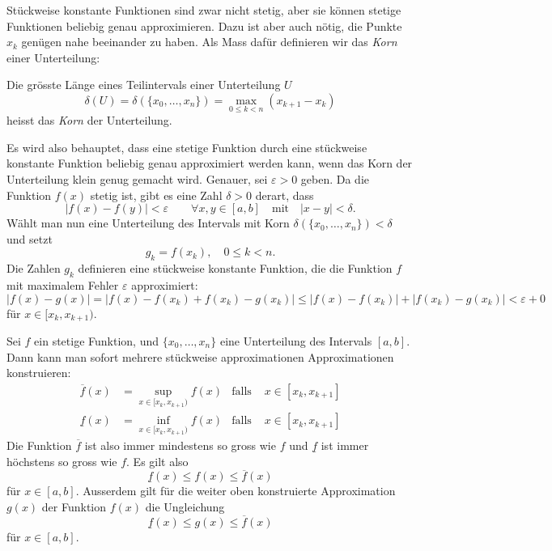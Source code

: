 Stückweise konstante Funktionen sind zwar nicht stetig, aber sie können
stetige Funktionen beliebig genau approximieren.
Dazu ist aber auch nötig, die Punkte $x_k$ genügen nahe beeinander zu
haben.
Als Mass dafür definieren wir das {\em Korn} einer Unterteilung:

\begin{definition}
Die grösste Länge eines Teilintervals einer Unterteilung $U$
\[
\delta(U)
=
\delta(\{x_0,\dots,x_n\})
=
\max_{0\le k < n} (x_{k+1}-x_{k})
\]
heisst das {\em Korn} der Unterteilung.
\end{definition}

Es wird also behauptet, dass eine stetige Funktion durch eine stückweise
konstante Funktion beliebig genau approximiert werden kann, wenn das
Korn der Unterteilung klein genug gemacht wird.
Genauer, sei $\varepsilon>0$ geben.
Da die Funktion $f(x)$ stetig ist, gibt es eine Zahl $\delta>0$ derart,
dass
\[
|f(x) - f(y)| < \varepsilon\qquad\forall x,y\in [a,b]\quad\text{mit}\quad
|x-y|<\delta.
\]
Wählt man nun eine Unterteilung des Intervals mit Korn
$\delta(\{x_0,\dots,x_n\}) < \delta$ und setzt
\[
g_k = f(x_k),\quad 0\le k < n.
\]
Die Zahlen $g_k$ definieren eine stückweise konstante Funktion, die 
die Funktion $f$ mit maximalem Fehler $\varepsilon$ approximiert:
\[
|f(x)-g(x)|
=
|f(x) - f(x_k) + f(x_k) - g(x_k)|
\le
|f(x) - f(x_k)| + |f(x_k) - g(x_k)|
<
\varepsilon + 0
\]
für $x\in [x_k,x_{k+1})$.

Sei $f$ ein stetige Funktion, und $\{x_0,\dots,x_n\}$ eine Unterteilung
des Intervals $[a,b]$.
Dann kann man sofort mehrere stückweise approximationen Approximationen 
konstruieren:
\begin{equation*}
\begin{aligned}
\overline{f}(x)
&= 
\sup_{x\in[x_k,x_{k+1})} f(x)
&\text{falls }&x\in[x_k,x_{k+1}]
\\
\underline{f}(x)
&= 
\inf_{x\in[x_k,x_{k+1})} f(x)
&\text{falls }&x\in[x_k,x_{k+1}]
\end{aligned}
\end{equation*}
Die Funktion $\overline{f}$ ist also immer mindestens so gross wie $f$
und $\underline{f}$ ist immer höchstens so gross wie $f$.
Es gilt also
\[
\underline{f}(x) \le f(x) \le \overline{f}(x)
\]
für $x\in[a,b]$.
Ausserdem gilt für die weiter oben konstruierte Approximation $g(x)$ der
Funktion $f(x)$ die Ungleichung
\[
\underline{f}(x) \le g(x) \le \overline{f}(x)
\]
für $x\in[a,b]$.

